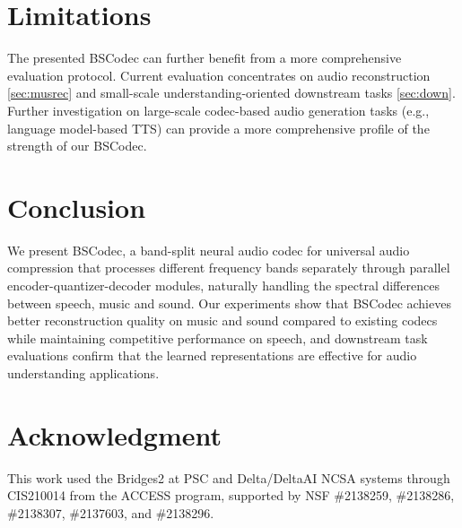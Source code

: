 \documentclass[11pt]{article}
\begin{document}
\section{Limitations}

The presented BSCodec can further benefit from a more comprehensive evaluation protocol. Current evaluation concentrates on audio reconstruction \ref{sec:musrec} and small-scale understanding-oriented downstream tasks \ref{sec:down}. Further investigation on large-scale codec-based audio generation tasks (e.g., language model-based TTS) can provide a more comprehensive profile of the strength of our BSCodec. 

\section{Conclusion}
We present BSCodec, a band-split neural audio codec for universal audio compression that processes different frequency bands separately through parallel encoder-quantizer-decoder modules, naturally handling the spectral differences between speech, music and sound. Our experiments show that BSCodec achieves better reconstruction quality on music and sound compared to existing codecs while maintaining competitive performance on speech, and downstream task evaluations confirm that the learned representations are effective for audio understanding applications. %

\section*{Acknowledgment}

This work used the Bridges2 at PSC and Delta/DeltaAI NCSA systems through CIS210014 from the ACCESS program, supported by NSF \#2138259, \#2138286, \#2138307, \#2137603, and \#2138296.


\end{document}
